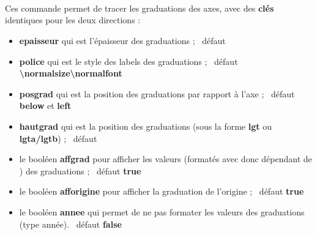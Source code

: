 \documentclass{article}
\newcommand\ctex[1]{\tcbox[vignettelatex]{#1}}
\newcommand\Cle[1]{{\bfseries\sffamily\textlangle #1\textrangle}}
\begin{document}
\begin{codetex}
	\PLaxestikz

	\PLaxestikz%
		[afflabel=xy,labelx={Année},labely={Altitude},%
		poslabelx={below right},poslabely={above left}%
		police=\small\sffamily]
\end{codetex}

\begin{codesortie}
\hfill~
\begin{tikzpicture}%
	[x=0.35cm,y=0.07cm,%
	Ox=1992,xmin=1992,xmax=2012,xgrille=2,xgrilles=1,%
	Oy=1640,ymin=1640,ymax=1730,ygrille=10,ygrilles=5]
	\PLaxestikz
\end{tikzpicture}
~~
\begin{tikzpicture}%
	[x=0.35cm,y=0.07cm,%
	Ox=1992,xmin=1992,xmax=2012,xgrille=2,xgrilles=1,%
	Oy=1640,ymin=1640,ymax=1730,ygrille=10,ygrilles=5]
	\PLaxestikz%
		[afflabel=xy,labelx={Année},labely={Altitude},%
		poslabelx={below right},poslabely={above left},%
		police=\small\sffamily]
\end{tikzpicture}
\hfill~
\end{codesortie}


\begin{codetex}
\end{codetex}

\begin{codecles}
Ces commande permet de tracer les graduations des axes, avec des \Cle{clés} identiques pour les deux directions :

\begin{itemize}
	\item \Cle{epaisseur} qui est l'épaisseur des graduations ; \hfill~défaut \Cle{1.25pt}
	\item \Cle{police} qui est le style des labels des graduations ; \hfill~défaut \Cle{\textbackslash{}normalsize\textbackslash{}normalfont}
	\item \Cle{posgrad} qui est la position des graduations par rapport à l'axe ; \hfill~défaut \Cle{below} et \Cle{left}
	\item \Cle{hautgrad} qui est la position des graduations (sous la forme \Cle{lgt} ou \Cle{lgta/lgtb}) ; \hfill~défaut \Cle{4pt}
	\item le booléen \Cle{affgrad} pour afficher les valeurs (formatés avec \ctex{num} donc dépendant de \ctex{sisetup}) des graduations  ; \hfill~défaut \Cle{true}
	\item le booléen \Cle{afforigine} pour afficher la graduation de l'origine ; \hfill~défaut \Cle{true}
	\item le booléen \Cle{annee} qui permet de ne pas formater les valeurs des graduations (type \textsf{année}). \hfill~défaut \Cle{false}
\end{itemize}
\end{codecles}
\end{document}
